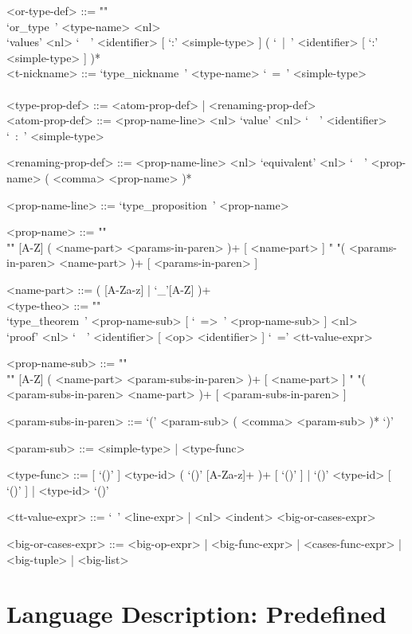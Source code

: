 \documentclass{article}
\begin{document}
\begin{grammar}
<or-type-def> ::= ""\\
`or_type\ ' <type-name> <nl> \\
`values' <nl> `\ \ ' <identifier> [ `:' <simple-type> ]
( `\ |\ ' <identifier> [ `:' <simple-type> ] )*
\\

<t-nickname> ::= `type_nickname\ ' <type-name> `\ =\ ' <simple-type>
\\\\

<type-prop-def> ::= <atom-prop-def> | <renaming-prop-def>
\\

<atom-prop-def> ::=
<prop-name-line> <nl> `value' <nl> `\ \ ' <identifier> `\ :\ ' <simple-type>

<renaming-prop-def> ::=
<prop-name-line> <nl> `equivalent' <nl> `\ \ ' <prop-name> ( <comma> <prop-name> )*

<prop-name-line> ::= `type_proposition\ ' <prop-name>

<prop-name> ::=  ""\\""
[A-Z] ( <name-part> <params-in-paren> )+ [ <name-part> ]
\alt " "( <params-in-paren> <name-part> )+ [ <params-in-paren> ]

<name-part> ::= ( [A-Za-z] | `_'[A-Z] )+
\\

<type-theo> ::= ""\\
`type_theorem\ ' <prop-name-sub> [ `\ =>\ ' <prop-name-sub> ] <nl> \\
`proof' <nl> `\ \ ' <identifier> [ <op> <identifier> ] `\ =' <tt-value-expr>

<prop-name-sub> ::=  ""\\""
[A-Z] ( <name-part> <param-subs-in-paren> )+ [ <name-part> ]
\alt " "( <param-subs-in-paren> <name-part> )+ [ <param-subs-in-paren> ]

<param-subs-in-paren> ::= `(' <param-sub> ( <comma> <param-sub> )* `)'

<param-sub> ::= <simple-type> | <type-func>

<type-func> ::=
[ `()' ] <type-id> ( `()' [A-Za-z]+ )+ [ `()' ] | `()' <type-id> [ `()' ] |
<type-id> `()'

<tt-value-expr> ::= `\ ' <line-expr> | <nl> <indent> <big-or-cases-expr>

<big-or-cases-expr> ::=
<big-op-expr> | <big-func-expr> | <cases-func-expr> | <big-tuple> | <big-list>
\end{grammar}

\section{Language Description: Predefined}
\end{document}
